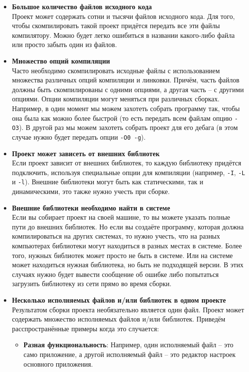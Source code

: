 \documentclass{article}
\begin{document}
\begin{itemize}
\item \textbf{Большое количество файлов исходного кода}\\
Проект может содержать сотни и тысячи файлов исходного кода. Для того, чтобы скомпилировать такой проект придётся передать все эти файлы компилятору. Можно будет легко ошибиться в названии какого-либо файла или просто забыть один из файлов.

\item \textbf{Множество опций компиляции}\\
Часто необходимо скомпилировать исходные файлы с использованием множества различных опций компиляции и линковки. Причём, часть файлов должны быть скомпилированы с одними опциями, а другая часть -- с другими опциями. Опции компиляции могут меняться при различных сборках. Например, в один момент мы можем захотеть собрать программу так, чтобы она была как можно более быстрой (то есть передать всем файлам опцию \texttt{-O3}). В другой раз мы можем захотеть собрать проект для его дебага (в этом случае нужно будет передать опции \texttt{-O0 -g}).

\item \textbf{Проект может зависеть от внешних библиотек}\\
Если проект зависит от внешних библиотек, то каждую библиотеку придётся подключить, используя специальные опции для компиляции (например, \texttt{-I}, \texttt{-L} и \texttt{-l}). Внешние библиотеки могут быть как статическими, так и динамическими, это также нужно учесть при сборке. 

\item \textbf{Внешние библиотеки необходимо найти в системе}\\
Если вы собирает проект на своей машине, то вы можете указать полные пути до внешних библиотек. Но если вы создаёте программу, которая должна компилироваться на других системах, то нужно учесть, что на разных компьютерах библиотеки могут находиться в разных местах в системе. Более того, нужных библиотек может просто не быть в системе. Или на системе может находиться нужная библиотека, но быть не подходящей версии. В этих случаях нужно будет вывести сообщение об ошибке либо попытаться загрузить библиотеку из сети прямо во время сборки.


\item \textbf{Несколько исполняемых файлов и/или библиотек в одном проекте}\\
Результатом сборки проекта необязательно является один файл. Проект может содержать множество исполняемых файлов и/или библиотек. Приведём расспространённые примеры когда это случается:
\begin{itemize}
\item \textbf{Разная функциональность}: Например, один исполняемый файл -- это само приложение, а другой исполняемый файл -- это редактор настроек основного приложения.


\end{itemize}
\end{itemize}
\end{document}
